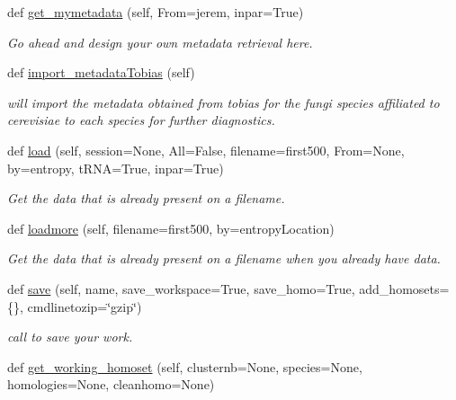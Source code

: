 \begin{DoxyCompactItemize}
def \mbox{\hyperlink{class_py_c_u_b_1_1py_c_u_b_1_1_py_c_u_b_a1ff011ae5b64518d60bedcf1b98314ef}{get\+\_\+mymetadata}} (self, From=\textquotesingle{}jerem\textquotesingle{}, inpar=True)
\begin{DoxyCompactList}\small\item\em Go ahead and design your own metadata retrieval here. \end{DoxyCompactList}\item 
def \mbox{\hyperlink{class_py_c_u_b_1_1py_c_u_b_1_1_py_c_u_b_acd80f084f6671584c42542813874cd02}{import\+\_\+metadata\+Tobias}} (self)
\begin{DoxyCompactList}\small\item\em will import the metadata obtained from tobias for the fungi species affiliated to cerevisiae to each species for further diagnostics. \end{DoxyCompactList}\item 
def \mbox{\hyperlink{class_py_c_u_b_1_1py_c_u_b_1_1_py_c_u_b_ab471e823b0eba23af5a5322008ec09da}{load}} (self, session=None, All=False, filename=\textquotesingle{}first500\textquotesingle{}, From=None, by=\textquotesingle{}entropy\textquotesingle{}, t\+R\+NA=True, inpar=True)
\begin{DoxyCompactList}\small\item\em Get the data that is already present on a filename. \end{DoxyCompactList}\item 
def \mbox{\hyperlink{class_py_c_u_b_1_1py_c_u_b_1_1_py_c_u_b_a16a1ab6be5dddcedf94852088936c1f2}{loadmore}} (self, filename=\textquotesingle{}first500\textquotesingle{}, by=\textquotesingle{}entropy\+Location\textquotesingle{})
\begin{DoxyCompactList}\small\item\em Get the data that is already present on a filename when you already have data. \end{DoxyCompactList}\item 
def \mbox{\hyperlink{class_py_c_u_b_1_1py_c_u_b_1_1_py_c_u_b_a477c55065989b10bce8389c5edaf3322}{save}} (self, name, save\+\_\+workspace=True, save\+\_\+homo=True, add\+\_\+homosets=\{\}, cmdlinetozip=\char`\"{}gzip\char`\"{})
\begin{DoxyCompactList}\small\item\em call to save your work. \end{DoxyCompactList}\item 
def \mbox{\hyperlink{class_py_c_u_b_1_1py_c_u_b_1_1_py_c_u_b_a1916ef696d74af1028a2aeff643727db}{get\+\_\+working\+\_\+homoset}} (self, clusternb=None, species=None, homologies=None, cleanhomo=None)

\end{DoxyCompactItemize}
